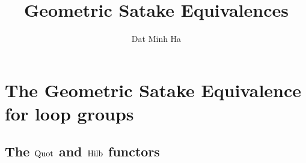 

\setcounter{section}{-1}





    \title{Geometric Satake Equivalences}
    
    \author{Dat Minh Ha}
    \maketitle
    
    \begin{abstract}
    
    \end{abstract}
    
    {
        \hypersetup{} 
        \tableofcontents %
    }
    
    \chapter{The Geometric Satake Equivalence for loop groups}
        
        
    \begin{appendices}
        \chapter{The \texorpdfstring{$\mathrm{Quot}$}{} and \texorpdfstring{$\mathrm{Hilb}$}{} functors}
            \begin{abstract}
            
            \end{abstract}
            
            \minitoc
            
            
            
            
            
            
            
    \end{appendices}
    
    \printbibliography

